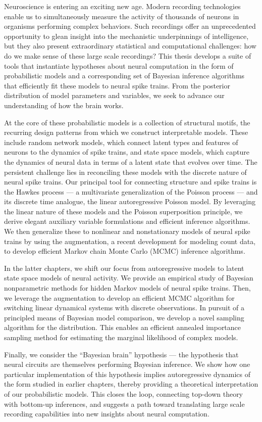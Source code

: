 Neuroscience is entering an exciting new age.  Modern recording
technologies enable us to simultaneously measure the activity of
thousands of neurons in organisms performing complex behaviors.  Such
recordings offer an unprecedented opportunity to glean insight into
the mechanistic underpinnings of intelligence, but they also present
extraordinary statistical and computational challenges: how do we make
sense of these large scale recordings?
This thesis develops a suite of tools that instantiate
hypotheses about neural computation in the form of
probabilistic models and a corresponding set of Bayesian inference
algorithms that efficiently fit these models to neural spike trains.
From the posterior distribution of model parameters and variables,
we seek to advance our understanding of how the brain works. 

At the core of these probabilistic models is a collection of
structural motifs, the recurring design patterns from which we
construct interpretable models. These include random network models,
which connect latent types and features of neurons to the dynamics of
spike trains, and state space models, which capture the dynamics of
neural data in terms of a latent state that evolves over time.  The
persistent challenge lies in reconciling these models with the
discrete nature of neural spike trains.  Our principal tool for
connecting structure and spike trains is the Hawkes process --- a
multivariate generalization of the Poisson process --- and its
discrete time analogue, the linear autoregressive Poisson model.  By
leveraging the linear nature of these models and the Poisson
superposition principle, we derive elegant auxiliary variable
formulations and efficient inference algorithms. We then generalize
these to nonlinear and nonstationary models of neural spike trains by
using the \polyagamma augmentation, a recent development for modeling
count data, to develop efficient Markov chain Monte Carlo (MCMC)
inference algorithms.

In the latter chapters, we shift our focus from autoregressive models
to latent state space models of neural activity. We provide an
empirical study of Bayesian nonparametric methods for hidden Markov
models of neural spike trains. Then, we leverage the \polyagamma
augmentation to develop an efficient MCMC algorithm for switching
linear dynamical systems with discrete observations.  In pursuit of a
principled means of Bayesian model comparison, we develop a novel
sampling algorithm for the \polyagamma distribution. This enables an
efficient annealed importance sampling method for estimating the
marginal likelihood of complex models.

Finally, we consider the ``Bayesian brain'' hypothesis --- the
hypothesis that neural circuits are themselves performing Bayesian
inference.  We show how one particular implementation of this
hypothesis implies autoregressive dynamics of the form studied
in earlier chapters, thereby providing a theoretical interpretation of
our probabilistic models.  This closes the
loop, connecting top-down theory with bottom-up inferences, and
suggests a path toward translating large scale recording
capabilities into new insights about neural computation.


